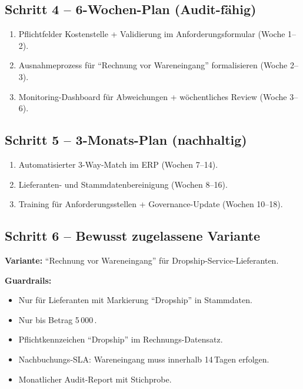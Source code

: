 \documentclass[11pt,a4paper,oneside]{article}
\begin{document}
\medskip

\subsection{Schritt 4 -- 6-Wochen-Plan (Audit-fähig)}

\begin{enumerate}
  \item Pflichtfelder Kostenstelle + Validierung im Anforderungsformular (Woche 1--2).
  \item Ausnahmeprozess für ``Rechnung vor Wareneingang'' formalisieren (Woche 2--3).
  \item Monitoring-Dashboard für Abweichungen + wöchentliches Review (Woche 3--6).
\end{enumerate}

\subsection{Schritt 5 -- 3-Monats-Plan (nachhaltig)}

\begin{enumerate}
  \item Automatisierter 3-Way-Match im ERP (Wochen 7--14).
  \item Lieferanten- und Stammdaten\-bereinigung (Wochen 8--16).
  \item Training für Anforderungsstellen + Governance-Update (Wochen 10--18).
\end{enumerate}

\subsection{Schritt 6 -- Bewusst zugelassene Variante}

\textbf{Variante:} ``Rechnung vor Wareneingang'' für Dropship-Service-Lieferanten.

\textbf{Guardrails:}
\begin{itemize}
  \item Nur für Lieferanten mit Markierung ``Dropship'' in Stammdaten.
  \item Nur bis Betrag 5\,000\,\text{\euro}.
  \item Pflichtkennzeichen ``Dropship'' im Rechnungs-Datensatz.
  \item Nachbuchungs-SLA: Wareneingang muss innerhalb 14\,Tagen erfolgen.
  \item Monatlicher Audit-Report mit Stichprobe.
\end{itemize}
\end{document}
